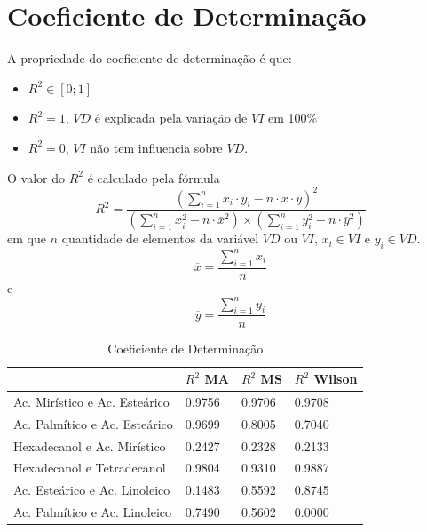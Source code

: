 \section{Coeficiente de Determinação}

A propriedade do coeficiente de determinação é que:
\begin{itemize}
    \item $R^2\in [0;1]$
    \item $R^2=1$, $VD$ é explicada pela variação de $VI$ em 100\%
    \item $R^2=0$, $VI$ não tem influencia sobre $VD$.
\end{itemize}

O valor do $R^2$ é calculado pela fórmula
\begin{equation}
    R^2=\frac{\left(\displaystyle\sum_{i=1}^{n}x_i\cdot y_i-n\cdot\overline{x}\cdot\overline{y}\right)^2}{\left(\displaystyle\sum_{i=1}^{n}x_i^2-n\cdot\overline{x}^2\right)\times\left(\displaystyle\sum_{i=1}^{n}y_i^2-n\cdot\overline{y}^2\right)}
\end{equation}
em que $n$ quantidade de elementos da variável $VD$ ou $VI$, $x_i\in VI$ e $y_i\in VD$.
\begin{equation}
    \overline{x}=\frac{\displaystyle\sum_{i=1}^{n}x_i}{n}
\end{equation}
e
\begin{equation}
    \overline{y}=\frac{\displaystyle\sum_{i=1}^{n}y_i}{n}
\end{equation}

\begin{table}[H]
    \caption{Coeficiente de Determinação}
    \centering
    \begin{tabular}{l|p{3cm}p{3cm}p{3cm}}
    \hline
         & $R^2$ MA & $R^2$ MS & $R^2$ Wilson \\
    \hline
    Ac. Mirístico e Ac. Esteárico  & 0.9756  & 0.9706 & 0.9708 \\
    Ac. Palmítico e Ac. Esteárico  & 0.9699  & 0.8005 & 0.7040 \\
    Hexadecanol e Ac. Mirístico  & 0.2427  & 0.2328 & 0.2133 \\
    Hexadecanol e Tetradecanol  & 0.9804  & 0.9310 & 0.9887 \\
    Ac. Esteárico e Ac. Linoleico  & 0.1483  & 0.5592 & 0.8745 \\
    Ac. Palmítico e Ac. Linoleico  & 0.7490  & 0.5602 & 0.0000 \\
    \end{tabular}
    \label{tab:1}
\end{table}

